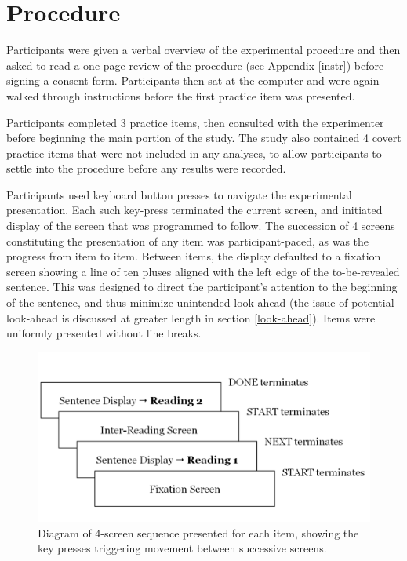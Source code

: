 \documentclass[12pt,oneside]{book}
\begin{document}
\hypertarget{procedure}{%
\section{Procedure}\label{procedure}}

Participants were given a verbal overview of the experimental procedure and then asked to read a one page review of the procedure (see Appendix \ref{instr}) before signing a consent form. Participants then sat at the computer and were again walked through instructions before the first practice item was presented.

Participants completed 3 practice items, then consulted with the experimenter before beginning the main portion of the study. The study also contained 4 covert practice items that were not included in any analyses, to allow participants to settle into the procedure before any results were recorded.

Participants used keyboard button presses to navigate the experimental presentation. Each such key-press terminated the current screen, and initiated display of the screen that was programmed to follow. The succession of 4 screens constituting the presentation of any item was participant-paced, as was the progress from item to item. Between items, the display defaulted to a fixation screen showing a line of ten pluses aligned with the left edge of the to-be-revealed sentence. This was designed to direct the participant's attention to the beginning of the sentence, and thus minimize unintended look-ahead (the issue of potential look-ahead is discussed at greater length in section \ref{look-ahead}). Items were uniformly presented without line breaks.

\begin{figure}
\centering
\includegraphics{procedure-diagram.png}
\caption{\label{fig:screens}Diagram of 4-screen sequence presented for each item, showing the key presses triggering movement between successive screens.}
\end{figure}
\end{document}
